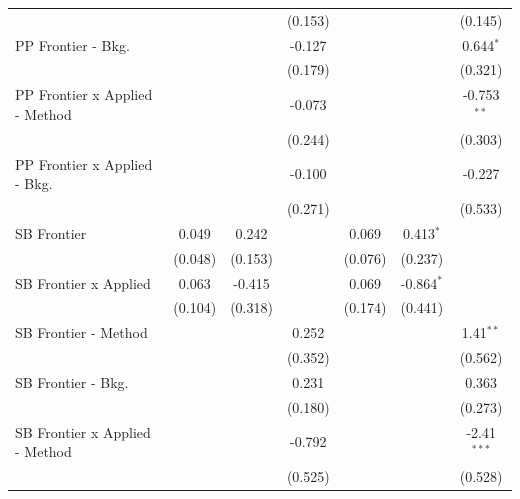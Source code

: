 \begin{tabular}{lcccccc}
                                  &              &              & (0.153)       &         &               & (0.145)\\   
   PP Frontier - Bkg.             &              &              & -0.127        &         &               & 0.644$^{*}$\\   
                                  &              &              & (0.179)       &         &               & (0.321)\\   
   PP Frontier x Applied - Method &              &              & -0.073        &         &               & -0.753$^{**}$\\   
                                  &              &              & (0.244)       &         &               & (0.303)\\   
   PP Frontier x Applied - Bkg.   &              &              & -0.100        &         &               & -0.227\\   
                                  &              &              & (0.271)       &         &               & (0.533)\\   
   SB Frontier                    & 0.049        & 0.242        &               & 0.069   & 0.413$^{*}$   &   \\   
                                  & (0.048)      & (0.153)      &               & (0.076) & (0.237)       &   \\   
   SB Frontier x Applied          & 0.063        & -0.415       &               & 0.069   & -0.864$^{*}$  &   \\   
                                  & (0.104)      & (0.318)      &               & (0.174) & (0.441)       &   \\   
   SB Frontier - Method           &              &              & 0.252         &         &               & 1.41$^{**}$\\   
                                  &              &              & (0.352)       &         &               & (0.562)\\   
   SB Frontier - Bkg.             &              &              & 0.231         &         &               & 0.363\\   
                                  &              &              & (0.180)       &         &               & (0.273)\\   
   SB Frontier x Applied - Method &              &              & -0.792        &         &               & -2.41$^{***}$\\   
                                  &              &              & (0.525)       &         &               & (0.528)\\   

\end{tabular}
